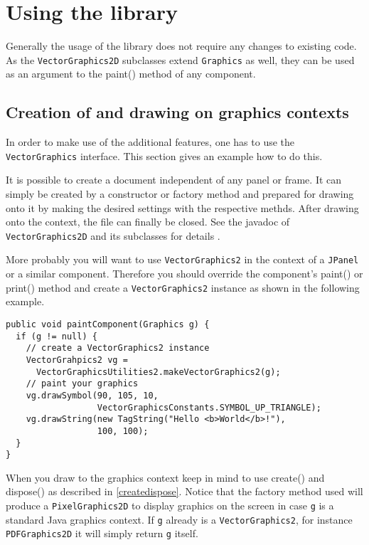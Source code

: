 \documentclass[a4paper]{article}
\newcommand{\class}[1]{\texttt{#1}}
\newcommand{\fhclass}[1]{\class{#1}}
\newcommand{\method}[1]{\textsf{#1}}
\newcommand{\code}[1]{\texttt{#1}}
\begin{document}
\section{Using the library}

Generally the usage of the library does not require any changes to
existing code. As the \fhclass{VectorGraphics2D} subclasses extend
\class{Graphics} as well, they can be used as an argument to the
\method{paint()} method of any component.

\subsection{Creation of and drawing on graphics contexts}

In order to make use of the additional features, one has to use the
\fhclass{Vec\-tor\-Gra\-phics} interface. This section gives an
example how to do this.

It is possible to create a document independent of any panel or
frame. It can simply be created by a constructor or factory method and
prepared for drawing onto it by making the desired settings with the
respective methds. After drawing onto the context, the file can finally
be closed. See the javadoc of \fhclass{VectorGraphics2D} and its subclasses
for details \cite{fhjavadoc}.

More probably you will want to use \fhclass{VectorGraphics2} in the
context of a \class{JPanel} or a similar component. Therefore you
should override the component's \method{paint()} or \method{print()}
method and create a \fhclass{VectorGraphics2} instance as shown in
the following example.
\medskip

\begin{verbatim}
public void paintComponent(Graphics g) {
  if (g != null) {
    // create a VectorGraphics2 instance
    VectorGrahpics2 vg = 
      VectorGraphicsUtilities2.makeVectorGraphics2(g);
    // paint your graphics
    vg.drawSymbol(90, 105, 10, 
                  VectorGraphicsConstants.SYMBOL_UP_TRIANGLE);
    vg.drawString(new TagString("Hello <b>World</b>!"), 
                  100, 100);
  } 
}
\end{verbatim}
\medskip

\noindent
When you draw to the graphics context keep in mind to use
\method{create()} and \method{dispose()} as described in
\ref{createdispose}. Notice that the factory method used will produce
a \fhclass{PixelGraphics2D} to display graphics on the screen in case
\code{g} is a standard Java graphics context. If \code{g} already is a
\fhclass{VectorGraphics2}, for instance \fhclass{PDFGraphics2D} it will
simply return \code{g} itself.
\end{document}
